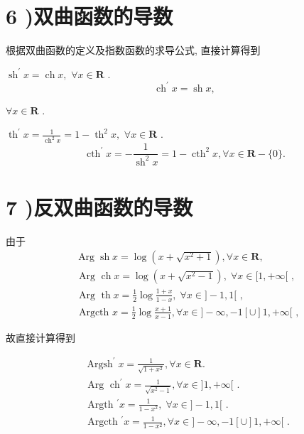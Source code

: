 \section*{6 )双曲函数的导数}

根据双曲函数的定义及指数函数的求导公式, 直接计算得到

${\operatorname{sh}}^{\prime }x = \operatorname{ch}x,$  $\forall x \in  \mathbf{R}$ .
$${\operatorname{ch}}^{\prime }x = \operatorname{sh}x,$$

$\forall x \in  \mathbf{R}$ .

${\operatorname{th}}^{\prime }x = \frac{1}{{\operatorname{ch}}^{2}x} = 1 - {\operatorname{th}}^{2}x,$  $\forall x \in  \mathbf{R}$ .
$${\operatorname{cth}}^{\prime }x =  - \frac{1}{{\operatorname{sh}}^{2}x} = 1 - {\operatorname{cth}}^{2}x,\forall x \in  \mathbf{R} - \{ 0\} .$$

\section*{7 )反双曲函数的导数}

由于
\begin{align*}
	&\operatorname{Arg}\operatorname{sh}x = \log \left( {x + \sqrt{{x}^{2} + 1}}\right) ,\forall x \in  \mathbf{R},\\
	&\text{ Arg }\operatorname{ch}x = \log \left( {x + \sqrt{{x}^{2} - 1}}\right) ,\;\forall x \in  \lbrack 1, + \infty \lbrack \text{ , }\\
	&\text{ Arg }\operatorname{th}x = \frac{1}{2}\log \frac{1 + x}{1 - x},\;\forall x \in  \rbrack  - 1,1\lbrack \text{ , }\\
	&\text{ Argcth }x = \frac{1}{2}\log \frac{x + 1}{x - 1},\forall x \in  \rbrack  - \infty , - 1\left\lbrack  \cup \right\rbrack  1, + \infty \lbrack \text{ , }
\end{align*}

故直接计算得到
 
\begin{align*}
	&{\operatorname{Argsh}}^{\prime }x = \frac{1}{\sqrt{1 + {x}^{2}}},\forall x \in  \mathbf{R}.\\
	&\text{ Arg }{\operatorname{ch}}^{\prime }x = \frac{1}{\sqrt{{x}^{2} - 1}},\forall x \in  \rbrack 1, + \infty \lbrack \text{ . }\\
	&\text{ Argth }{}^{\prime }x = \frac{1}{1 - {x}^{2}},\;\forall x \in  \rbrack  - 1,1\lbrack \text{ . }\\
	&\text{ Argcth }{}^{\prime }x = \frac{1}{1 - {x}^{2}},\forall x \in  \rbrack  - \infty , - 1\left\lbrack  \cup \right\rbrack  1, + \infty \lbrack \text{ . }
\end{align*}
 
